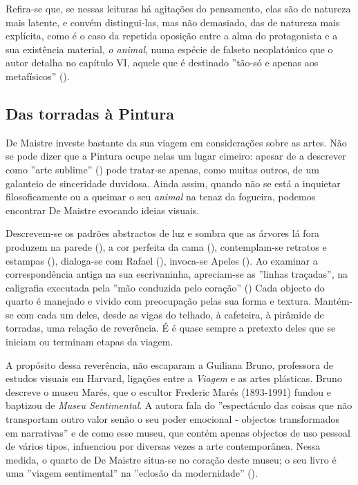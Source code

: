 \documentclass[12pt]{article}
\begin{document}
Refira-se que, se nessas leituras há agitações do pensamento, elas são
de natureza mais latente, e convém distingui-las, mas não demasiado,
das de natureza mais explícita, como é o caso da repetida oposição
entre a alma do protagonista e a sua existência material, \emph{o
  animal}, numa espécie de falseto neoplatónico que o autor detalha no
capítulo VI, aquele que é destinado ''tão-só e apenas aos
metafísicos'' (\cite[p.25]{demaistre}).

\subsection{Das torradas à Pintura}

De Maistre investe bastante da sua viagem em considerações sobre as
artes. Não se pode dizer que a Pintura ocupe nelas um lugar cimeiro:
apesar de a descrever como ''arte sublime'' (\cite[p.27]{demaistre})
pode tratar-se apenas, como muitas outros, de um galanteio de
sinceridade duvidosa. Ainda assim, quando não se está a inquietar
filosoficamente ou a queimar o seu \emph{animal} na tenaz da fogueira,
podemos encontrar De Maistre evocando ideias visuais.

Descrevem-se os padrões abstractos de luz e sombra que as árvores lá
fora produzem na parede (\cite[p.23]{demaistre}), a cor perfeita da
cama (\cite[p.53]{demaistre}), contemplam-se retratos e estampas
(\cite[p.34]{demaistre}), dialoga-se com Rafael
(\cite[p.65]{demaistre}), invoca-se Apeles
(\cite[p.69]{demaistre}). Ao examinar a correspondência antiga na sua
escrivaninha, apreciam-se as ''linhas traçadas'', na caligrafia
executada pela ''mão conduzida pelo coração'' (\cite[p.84]{demaistre})
Cada objecto do quarto é manejado e vivido com preocupação pelas sua
forma e textura. Mantém-se com cada um deles, desde as vigas do
telhado, à cafeteira, à pirâmide de torradas, uma relação de
reverência. É é quase sempre a pretexto deles que se iniciam ou
terminam etapas da viagem.

A propósito dessa reverência, não escaparam a Guiliana Bruno,
professora de estudos visuais em Harvard, ligações entre a
\emph{Viagem} e as artes plásticas. Bruno descreve o museu Marés, que
o escultor Frederic Marés (1893-1991) fundou e baptizou de \emph{Museu
  Sentimental}. A autora fala do ''espectáculo das coisas que não
transportam outro valor senão o seu poder emocional - objectos
transformados em narrativas'' e de como esse museu, que contém apenas
objectos de uso pessoal de vários tipos, infuenciou por diversas vezes
a arte contemporânea. Nessa medida, o quarto de De Maistre situa-se no
coração deste museu; o seu livro é uma ''viagem sentimental'' na
''eclosão da modernidade'' (\cite[p.133]{bruno2002atlas}).
\end{document}
